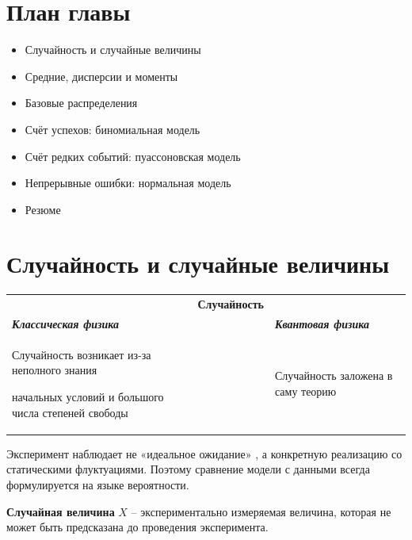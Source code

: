 \documentclass[
  russian,
  12pt,
  a4paper,
  a4paper,
  openany]{scrbook}
\newcounter{none} %
\providecommand{\tightlist}{%
  \setlength{\itemsep}{0pt}\setlength{\parskip}{0pt}}
\begin{document}
\section{План
главы}\label{ux43fux43bux430ux43d-ux433ux43bux430ux432ux44b}

\begin{itemize}
\tightlist
\item
  Случайность и случайные величины
\item
  Средние, дисперсии и моменты
\item
  Базовые распределения
\item
  Счёт успехов: биномиальная модель
\item
  Счёт редких событий: пуассоновская модель
\item
  Непрерывные ошибки: нормальная модель
\item
  Резюме
\end{itemize}

\section{Случайность и случайные
величины}\label{ux441ux43bux443ux447ux430ux439ux43dux43eux441ux442ux44c-ux438-ux441ux43bux443ux447ux430ux439ux43dux44bux435-ux432ux435ux43bux438ux447ux438ux43dux44b}

{\def\LTcaptype{none} %
\begin{longtable}[]{@{}
  >{\centering\arraybackslash}p{}
  >{\centering\arraybackslash}p{}
  >{\centering\arraybackslash}p{}@{}}
\toprule\noalign{}
\endhead
\bottomrule\noalign{}
\endlastfoot
& \textbf{Случайность} & \\
\textbf{\emph{Классическая физика}} & & \textbf{\emph{Квантовая
физика}} \\
Случайность возникает из-за неполного знания

начальных условий и большого числа степеней свободы & & Случайность
заложена в саму теорию \\
\end{longtable}
}

Эксперимент наблюдает не «идеальное ожидание» , а конкретную реализацию
со статическими флуктуациями. Поэтому сравнение модели с данными всегда
формулируется на языке вероятности.

\textbf{Случайная величина} \(X\) -- экспериментально измеряемая
величина, которая не может быть предсказана до проведения эксперимента.
\end{document}
